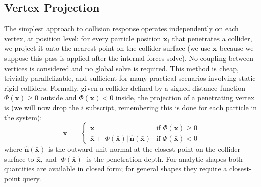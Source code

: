 \documentclass{article}
\begin{document}
\subsection{Vertex Projection}
The simplest approach to collision response operates independently on each vertex, at position level: for every particle position $\bar{\mathbf{x}}_i$ that penetrates a collider, we project it onto the nearest point on the collider surface (we use $\bar{\mathbf{x}}$ because we suppose this pass is applied after the internal forces solve). No coupling between vertices is considered and no global solve is required. This method is cheap, trivially parallelizable, and sufficient for many practical scenarios involving static rigid colliders.
\newline Formally, given a collider defined by a signed distance function $\Phi(\mathbf{x}) \geq 0$ outside and $\Phi(\mathbf{x}) < 0$ inside, the projection of a penetrating vertex is (we will now drop the $i$ subscript, remembering this is done for each particle in the system):
\begin{equation}
    \bar{\mathbf{x}}^+ = \begin{cases}
        \bar{\mathbf{x}} & \text{if } \Phi(\bar{\mathbf{x}}) \geq 0 \\
        \bar{\mathbf{x}} + |\Phi(\bar{\mathbf{x}})|\,\hat{\mathbf{n}}(\bar{\mathbf{x}}) & \text{if } \Phi(\bar{\mathbf{x}}) < 0
    \end{cases}
\end{equation}
where $\hat{\mathbf{n}}(\bar{\mathbf{x}})$ is the outward unit normal at the closest point on the collider surface to $\bar{\mathbf{x}}$, and $|\Phi(\bar{\mathbf{x}})|$ is the penetration depth. For analytic shapes both quantities are available in closed form; for general shapes they require a closest-point query.
\end{document}
